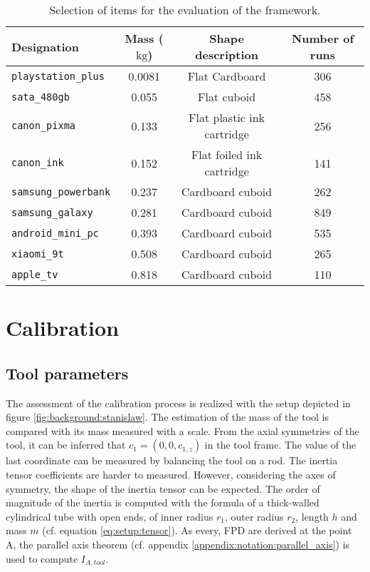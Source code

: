 \documentclass[/home/francois/latex/report/main.tex]{subfiles}
\begin{document}
\begin{table}[h]
  \begin{center}
    \renewcommand{\arraystretch}{1.2} %
    \begin{tabular}{l|c|c|c} %
      \textbf{Designation} & \textbf{Mass ($\si{\kilogram}$)} & \textbf{Shape description} & \textbf{Number of runs}\\
      \hline
      \texttt{playstation\_plus}  & 0.0081 & Flat Cardboard & 306 \\
      \hline
      \texttt{sata\_480gb}  & 0.055 & Flat cuboid & 458\\
      \hline
      \texttt{canon\_pixma}  & 0.133 & Flat plastic ink cartridge & 256\\
      \hline
      \texttt{canon\_ink}  & 0.152 & Flat foiled ink cartridge & 141 \\
      \hline
      \texttt{samsung\_powerbank}  & 0.237 & Cardboard cuboid & 262\\
      \hline
      \texttt{samsung\_galaxy}  & 0.281 & Cardboard cuboid & 849 \\
      \hline
      \texttt{android\_mini\_pc}  & 0.393 & Cardboard cuboid & 535\\
      \hline
      \texttt{xiaomi\_9t}  & 0.508 & Cardboard cuboid & 265 \\
      \hline
      \texttt{apple\_tv}  & 0.818 & Cardboard cuboid & 110 \\
      \hline
    \end{tabular}
  \end{center}
  \caption{Selection of items for the evaluation of the framework.\label{tab:setup:items}}
\end{table}

\section{Calibration}

\subsection{Tool parameters}
\label{subsection:setup:calibration:tool}

The assessment of the calibration process is realized with the setup depicted in figure \ref{fig:background:stanislaw}. The estimation of the mass of the tool is compared with its mass measured with a scale. From the axial symmetries of the tool, it can be inferred that $c_1 = (0, 0, c_{1,z})$ in the tool frame. The value of the last coordinate can be measured by balancing the tool on a rod. The inertia tensor coefficients are harder to measured. However, considering the axes of symmetry, the shape of the inertia tensor can be expected. The order of magnitude of the inertia is computed with the formula of a thick-walled cylindrical tube with open ends, of inner radius $r_1$, outer radius $r_2$, length $h$ and mass $m$ (cf. equation \ref{eq:setup:tensor}). As every, \ac{FPD} are derived at the point A, the parallel axis theorem (cf. appendix \ref{appendix:notation:parallel_axis}) is used to compute $I_{A, tool}$.
\end{document}
